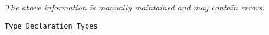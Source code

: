 \label{pkg:type\_declaration\_types}

{\tiny \it The above information is manually maintained and may contain errors.}
\begin{verbatim}
Type_Declaration_Types
\end{verbatim}
